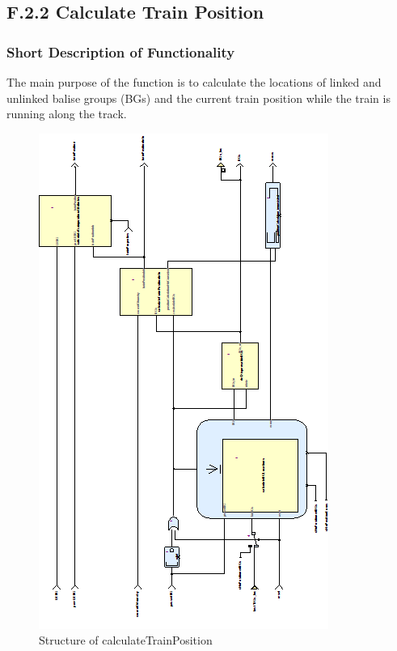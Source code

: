 \subsection{F.2.2 Calculate Train Position}\label{sss:calctrainpos}

\subsubsection{Short Description of Functionality}
The main purpose of the function is to calculate the locations of linked and unlinked balise groups (BGs) and the current train position while the train is running along the track. 

\begin{figure}[hbtp]
\centering
\includegraphics[scale=1]{../images/CalculateTrainPosition.png}
\caption{Structure of calculateTrainPosition}
\end{figure}


